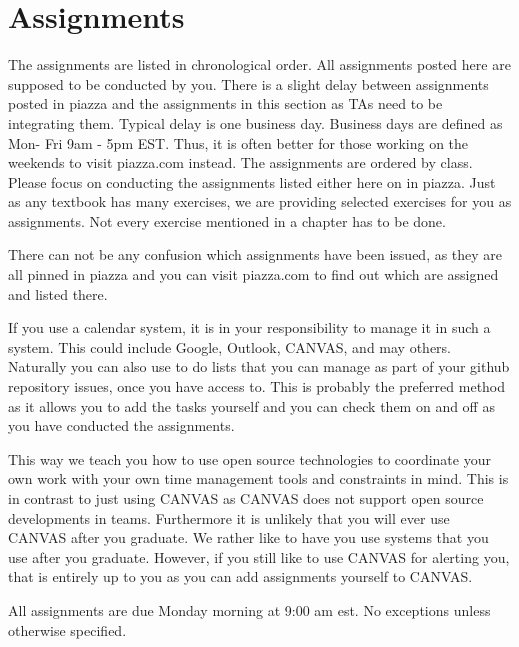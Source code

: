 \chapter{Assignments}
\label{c:assignments}

The assignments are listed in chronological order. All assignments
posted here are supposed to be conducted by you. There is a slight
delay between assignments posted in piazza and the assignments in this
section as TAs need to be integrating them. Typical delay is one
business day. Business days are defined as Mon- Fri 9am - 5pm
EST. Thus, it is often better for those working on the weekends to
visit piazza.com instead. The assignments are ordered by class. Please
focus on conducting the assignments listed either here on in
piazza. Just as any textbook has many exercises, we are providing
selected exercises for you as assignments. Not every exercise
mentioned in a chapter has to be done.

\begin{IU}
There can not be any confusion which assignments have been
issued, as they are all pinned in piazza and you can visit piazza.com
to find out which are assigned and listed there.
\end{IU}

If you use a calendar system, it is in your responsibility
to manage it in such a system. This could include Google, Outlook,
CANVAS, and may others. Naturally you can also use to do lists that
you can manage as part of your github repository issues, once you have
access to. This is probably the preferred method as it allows you to
add the tasks yourself and you can check them on and off as you have
conducted the assignments. 

This way we teach you how to use open source technologies to
coordinate your own work with your own time management tools and
constraints in mind. This is in contrast to just using CANVAS as
CANVAS does not support open source developments in teams. Furthermore
it is unlikely that you will ever use CANVAS after you graduate. We
rather like to have you use systems that you use after you graduate.
However, if you still like to use CANVAS for alerting you, that is
entirely up to you as you can add assignments yourself to CANVAS. 

\smallskip

\begin{IU}
  All assignments are due Monday morning at 9:00 am est. No exceptions
  unless otherwise specified.
\end{IU}

